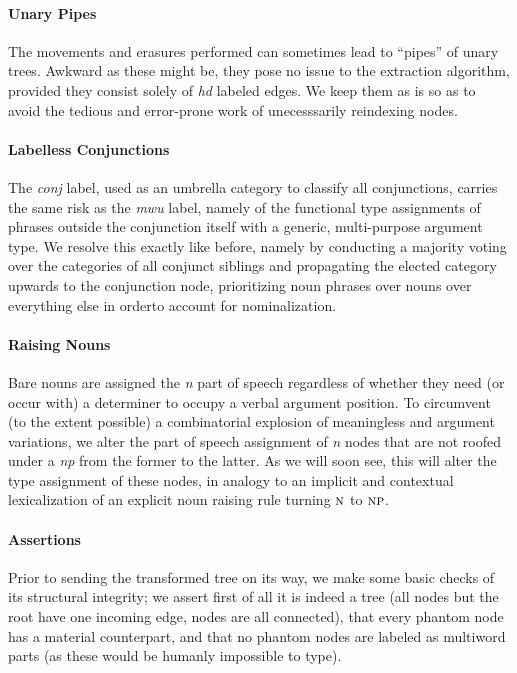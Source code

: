 \paragraph{Unary Pipes}
The movements and erasures performed can sometimes lead to ``pipes'' of unary trees.
Awkward as these might be, they pose no issue to the extraction algorithm, provided they consist solely of \textit{hd} labeled edges.
We keep them as is so as to avoid the tedious and error-prone work of unecesssarily reindexing nodes.

\paragraph{Labelless Conjunctions}
The \textit{conj} label, used as an umbrella category to classify all conjunctions, carries the same risk as the \textit{mwu} label, namely of  the functional type assignments of phrases outside the conjunction itself with a generic, multi-purpose argument type.
We resolve this exactly like before, namely by conducting a majority voting over the categories of all conjunct siblings and propagating the elected category upwards to the conjunction node, prioritizing noun phrases over nouns over everything else in orderto account for nominalization.

\paragraph{Raising Nouns}
Bare nouns are assigned the \textit{n} part of speech regardless of whether they need (or occur with) a determiner to occupy a verbal argument position.
To circumvent (to the extent possible) a combinatorial explosion of meaningless  and  argument variations, we alter the part of speech assignment of \textit{n} nodes that are not roofed under a \textit{np} from the former to the latter.
As we will soon see, this will alter the type assignment of these nodes, in analogy to an implicit and contextual lexicalization of an explicit noun raising rule turning $\n[s]$ to $\np[s]$.

\paragraph{Assertions}
Prior to sending the transformed tree on its way, we make some basic checks of its structural integrity; we assert first of all it is indeed a tree (all nodes but the root have one incoming edge, nodes are all connected), that every phantom node has a material counterpart, and that no phantom nodes are labeled as multiword parts (as these would be humanly impossible to type).

